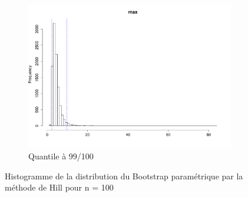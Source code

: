 \documentclass{article}
\renewcommand*{\(}{ \left( }
\renewcommand*{\)}{ \right) }
\begin{document}
\begin{figure}[H]
\begin{subfigure}[t]{0.3\textwidth}
        \includegraphics[width = \linewidth]{img/BootstrapParamHill-Max-100.pdf}
        \caption{Quantile à 99/100}
        \label{fig:BPHMax}
    \end{subfigure}%
    \caption{Histogramme de la distribution du Bootstrap paramétrique par la méthode de Hill pour n = 100}
    \label{fig:BPH}
\end{figure}
\end{document}
